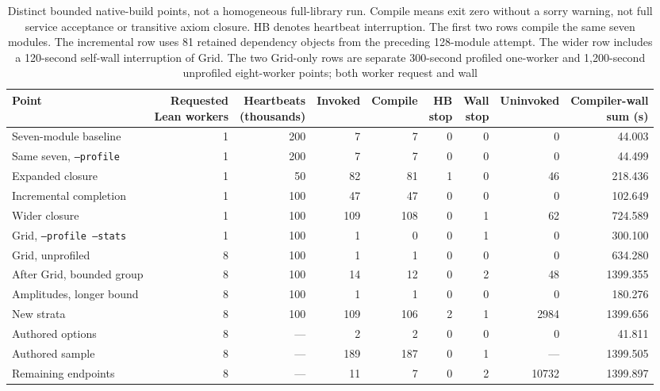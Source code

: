 \documentclass[10pt,twocolumn]{article}
\begin{document}
\begin{table}[t]
\centering
\small
\setlength{\tabcolsep}{5pt}
\begin{tabular}{lrrrrrrrr}
\toprule
Point & \shortstack{Requested\\Lean workers} & \shortstack{Heartbeats\\(thousands)} & Invoked & Compile &
\shortstack{HB\\stop} & \shortstack{Wall\\stop} & Uninvoked &
\shortstack{Compiler-wall\\sum (s)} \\
\midrule
Seven-module baseline & 1 & 200 & 7 & 7 & 0 & 0 & 0 & 44.003 \\
Same seven, \texttt{--profile} & 1 & 200 & 7 & 7 & 0 & 0 & 0 & 44.499 \\
Expanded closure & 1 & 50 & 82 & 81 & 1 & 0 & 46 & 218.436 \\
Incremental completion & 1 & 100 & 47 & 47 & 0 & 0 & 0 & 102.649 \\
Wider closure & 1 & 100 & 109 & 108 & 0 & 1 & 62 & 724.589 \\
Grid, \texttt{--profile --stats} & 1 & 100 & 1 & 0 & 0 & 1 & 0 & 300.100 \\
Grid, unprofiled & 8 & 100 & 1 & 1 & 0 & 0 & 0 & 634.280 \\
After Grid, bounded group & 8 & 100 & 14 & 12 & 0 & 2 & 48 & 1399.355 \\
Amplitudes, longer bound & 8 & 100 & 1 & 1 & 0 & 0 & 0 & 180.276 \\
New strata & 8 & 100 & 109 & 106 & 2 & 1 & 2984 & 1399.656 \\
Authored options & 8 & --- & 2 & 2 & 0 & 0 & 0 & 41.811 \\
Authored sample & 8 & --- & 189 & 187 & 0 & 1 & --- & 1399.505 \\
Remaining endpoints & 8 & --- & 11 & 7 & 0 & 2 & 10732 & 1399.897 \\
\bottomrule
\end{tabular}
\caption{Distinct bounded native-build points, not a homogeneous full-library
run. Compile means exit zero without a sorry warning, not full service
acceptance or transitive axiom closure. HB denotes heartbeat interruption.
The first two rows compile the same seven modules. The incremental row uses
81 retained dependency objects from the preceding 128-module attempt.
The wider row includes a 120-second self-wall interruption of Grid.
The two Grid-only rows are separate 300-second profiled one-worker and
1,200-second unprofiled eight-worker points; both worker request and wall
}
\end{table}
\end{document}
